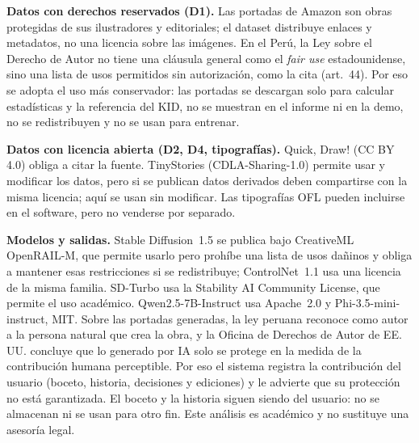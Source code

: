 \documentclass[10pt,a4paper,twocolumn]{article}
\begin{document}
\textbf{Datos con derechos reservados (D1).} Las portadas de Amazon son obras protegidas de sus ilustradores y editoriales; el dataset distribuye enlaces y metadatos, no una licencia sobre las imágenes. En el Perú, la Ley sobre el Derecho de Autor no tiene una cláusula general como el \emph{fair use} estadounidense, sino una lista de usos permitidos sin autorización, como la cita (art.~44). Por eso se adopta el uso más conservador: las portadas se descargan solo para calcular estadísticas y la referencia del KID, no se muestran en el informe ni en la demo, no se redistribuyen y no se usan para entrenar.

\textbf{Datos con licencia abierta (D2, D4, tipografías).} Quick, Draw! (CC BY 4.0) obliga a citar la fuente. TinyStories (CDLA-Sharing-1.0) permite usar y modificar los datos, pero si se publican datos derivados deben compartirse con la misma licencia; aquí se usan sin modificar. Las tipografías OFL pueden incluirse en el software, pero no venderse por separado.

\textbf{Modelos y salidas.} Stable Diffusion~1.5 se publica bajo CreativeML OpenRAIL-M, que permite usarlo pero prohíbe una lista de usos dañinos y obliga a mantener esas restricciones si se redistribuye; ControlNet~1.1 usa una licencia de la misma familia. SD-Turbo usa la Stability AI Community License, que permite el uso académico. Qwen2.5-7B-Instruct usa Apache~2.0 y Phi-3.5-mini-instruct, MIT. Sobre las portadas generadas, la ley peruana reconoce como autor a la persona natural que crea la obra, y la Oficina de Derechos de Autor de EE.\,UU. concluye que lo generado por IA solo se protege en la medida de la contribución humana perceptible. Por eso el sistema registra la contribución del usuario (boceto, historia, decisiones y ediciones) y le advierte que su protección no está garantizada. El boceto y la historia siguen siendo del usuario: no se almacenan ni se usan para otro fin. Este análisis es académico y no sustituye una asesoría legal.
\end{document}
